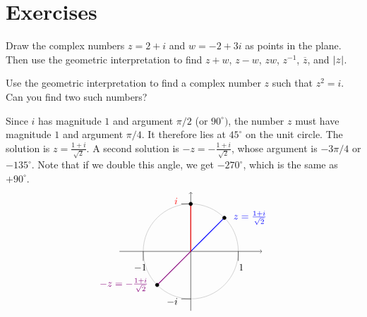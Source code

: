 \section*{Exercises}


\begin{ex}
  Draw the complex numbers $z = 2+i$ and $w = -2+3i$ as points in the
  plane. Then use the geometric interpretation to find $z+w$,
  $z-w$, $zw$, $z^{-1}$, $\overline{z}$, and $\left|z\right|$. 
\end{ex}

\begin{ex}
  Use the geometric interpretation to find a complex number $z$ such
  that $z^2 = i$. Can you find two such numbers?
  \begin{sol}
    Since $i$ has magnitude $1$ and argument $\pi/2$ (or
    $90^{\circ})$, the number $z$ must have magnitude $1$ and argument
    $\pi/4$. It therefore lies at $45^{\circ}$ on the unit circle. The
    solution is $z=\frac{1+i}{\sqrt{2}}$. A second solution is
    $-z=-\frac{1+i}{\sqrt{2}}$, whose argument is $-3\pi/4$ or
    $-135^{\circ}$. Note that if we double this angle, we get
    $-270^{\circ}$, which is the same as $+90^{\circ}$.
    \begin{equation*}
      \begin{tikzpicture}[scale=1.7]
        \draw[black!30] (0,0) circle (1);
        \draw[->](-1.5,0) -- (1.5,0);
        \draw[->](0,-1.25) -- (0,1.25);
        \draw(0,-1) -- +(-0.2,0) node[left,yshift=-3pt] {$-i$};
        \draw(0,1) -- +(-0.2,0) node[left,yshift=3pt,red] {$i$};
        \draw(-1,0) -- +(0,-0.2) node[below,xshift=-3pt] {$-1$};
        \draw(1,0) -- +(0,-0.2) node[below,xshift=3pt] {$1$};
        \draw[thick, blue] (0,0) -- (45:1);
        \draw[thick, purple!70!blue] (0,0) -- (225:1);
        \draw[thick, red] (0,0) -- (90:1);
        \draw[fill, black] (45:1) circle [radius=1.06pt] node [right=2mm, blue] {$z = \frac{1+i}{\sqrt{2}}$};
        \draw[fill, black] (225:1) circle [radius=1.06pt] node [left=2mm, purple!70!blue] {$-z = -\frac{1+i}{\sqrt{2}}$};
        \draw[fill, black] (90:1) circle [radius=1.06pt];
      \end{tikzpicture}
    \end{equation*}
  \end{sol}
\end{ex}

